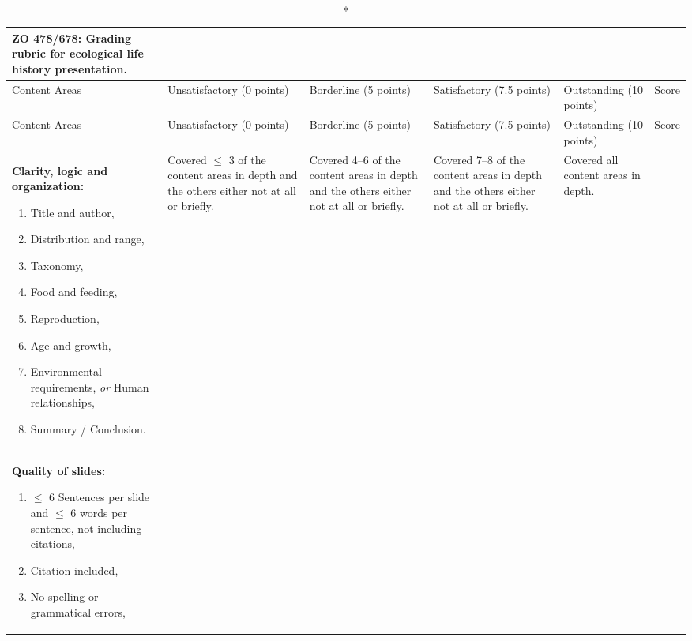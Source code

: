 \documentclass[10pt, twoside]{article}
\begin{document}
\begin{landscape}
{\small%
\begin{longtable}[l]{@{}L{5cm}L{3.5cm}L{3.5cm}L{3.5cm}L{3.5cm}L{1.9cm}@{}}
\caption*{\textbf{ZO 478/678: Grading rubric for ecological life history presentation.}}\\
\toprule
Content Areas & Unsatisfactory (0 points) & Borderline (5 points) & Satisfactory (7.5 points) & Outstanding (10 points) & Score \\ 
\midrule
\endfirsthead
\toprule
Content Areas & Unsatisfactory (0 points) & Borderline (5 points) & Satisfactory (7.5 points) & Outstanding (10 points) & Score\\ 
\midrule
\endhead
\textbf{Clarity, logic  and organization:}\par%
\vspace{-0.5\baselineskip}
\begin{enumerate}[itemsep=-0.25\baselineskip,align=left, leftmargin=*]
\item Title and author,
\item Distribution and range,
\item Taxonomy,
\item Food and feeding,
\item Reproduction,
\item Age and growth,
\item Environmental requirements, \emph{or}
Human relationships,
\item Summary / Conclusion.
\end{enumerate}&%
Covered $\leq$ 3 of the content areas in depth and the others either not at all or briefly. &%
Covered 4--6 of the content areas in depth and the others either not at all or briefly. &%
Covered 7--8 of the content areas in depth and the others either not at all or briefly. &%
Covered all content areas in depth.&%
\\[-1em]
\midrule
\textbf{Quality of slides:}\par%
\vspace{-0.5\baselineskip}
\begin{enumerate}[itemsep=-0.25\baselineskip,align=left, leftmargin=*]
\item $\leq$ 6 Sentences per slide and $\leq$ 6 words per sentence, not including citations, %
\item Citation included, \par%
\item No spelling or grammatical errors,\par%

\end{enumerate}
\end{longtable}}
\end{landscape}
\end{document}
